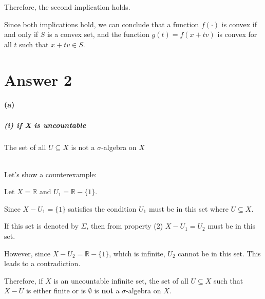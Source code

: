 \documentclass[12pt]{article}
\begin{document}
Therefore, the second implication holds.

Since both implications hold, we can conclude that a function \( f(·) \) is convex if and only if \( S \) is a convex set, and the function \( g(t) = f(x + tv) \) is convex for all \( t \) such that \( x + tv \in S \).


\section*{Answer 2}
\paragraph{(a)}
\subparagraph{(i) if X is uncountable} 
The set of all \( U \subseteq X \) is not a \(\sigma\)-algebra on \(X\) \\ \\
\par \hspace*{1em}Let's show a counterexample: \\
\par \hspace*{1em}Let \( X = \mathbb{R} \) and \( U_1 = \mathbb{R} - \{1\} \). \\
\par \hspace*{1em}Since \( X - U_1 = \{1\} \) satisfies the condition \( U_1 \) must be in this set where \( U \subseteq X \).\\
\par \hspace*{1em}If this set is denoted by \( \Sigma \), then from property (2) \( X - U_1 = U_2 \) must be in this set.\\

\par \hspace*{1em}However, since \( X - U_2 = \mathbb{R} - \{1\} \), which is infinite, \( U_2 \) cannot be in this set. This leads to a contradiction.\\

\par \hspace*{1em}Therefore, if \( X \) is an uncountable infinite set, the set of all \( U \subseteq X \) such that \( X - U \) is either finite or is \(\emptyset\) is \textbf{not}  a \( \sigma \)-algebra on \( X \).\\
\end{document}
